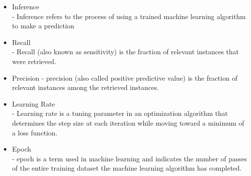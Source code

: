 \begin{itemize}
        \item Inference \\
              -  Inference refers to the process of using a trained machine learning algorithm to make a prediction

        \item Recall \\
              - Recall (also known as sensitivity) is the fraction of relevant instances that were retrieved.

        \item Precision
              - precision (also called positive predictive value) is the fraction of relevant instances among 
              the retrieved instances.
      
        \item Learning Rate \\
              - Learning rate is a tuning parameter in an optimization algorithm that determines the step size
               at each iteration while moving toward a minimum of a loss function.     
            
        \item Epoch \\
              - epoch is a term used in machine learning and indicates the number of passes of the entire
               training dataset the machine learning algorithm has completed. 
    \end{itemize}


